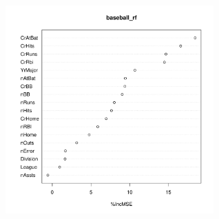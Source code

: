 \documentclass{article}\usepackage[]{graphicx}\usepackage[]{color}
\newenvironment{knitrout}{}{} %
\begin{document}
\begin{knitrout}
{\centering \includegraphics[width=0.6\textwidth]{figure/unnamed-chunk-8-1} 

}



\end{knitrout}
\end{document}
